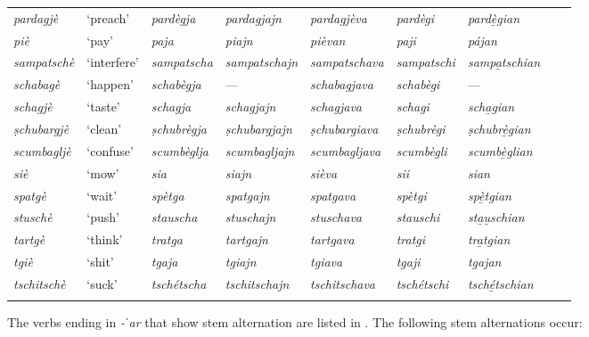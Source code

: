 \begin{sidewaystable}
\begin{tabularx}{\textwidth}{lllllllll}
		\textit{pardagjè} & ‘preach’ & \textit{pardègja} & \textit{pardagjajn} & \textit{pardagjèva} & \textit{pardègi} & \textit{pardè̱gian}\\
		\textit{piè} & ‘pay’ & \textit{paja} & \textit{piajn} & \textit{pièvan} & \textit{paji} & \textit{pájan}\\
		\textit{sampatschè} & ‘interfere’ & \textit{sampatscha} & \textit{sampatschajn} & \textit{sampatschava} & \textit{sampatschi} & \textit{sampa̱tschian}\\
		\textit{schabagè} & `happen' & \textit{schabègja} & --- & \textit{schabagjava} & \textit{schabègi} &  ---\\
		\textit{schagjè} & `taste' & \textit{schagja} & \textit{schagjajn} & \textit{schagjava} & \textit{schagi} & \textit{scha̱gian}\\
		\textit{ṣchubargjè} & `clean' & \textit{ṣchubrègja} & \textit{ṣchubargjajn} & \textit{ṣchubargiava} & \textit{ṣchubrègi} & \textit{ṣchubrè̱gian} \\
		\textit{scumbagljè} & `confuse' & \textit{scumbèglja} & \textit{scumbagljajn} & \textit{scumbagljava} & \textit{scumbègli} & \textit{scumbè̱glian}\\
		\textit{siè} & `mow' & \textit{sia} & \textit{siajn} & \textit{sièva} & \textit{sii} & \textit{sian}\\
		\textit{spatgè} & `wait' & \textit{spètga} & \textit{spatgajn} & \textit{spatgava} & \textit{spètgi} & \textit{spè̱tgian}\\
		\textit{stuschè} & `push' & \textit{stauscha} & \textit{stuschajn} & \textit{stuschava} & \textit{stauschi} & \textit{sta̱u̱schian}\\
		\textit{tartgè} & `think' & \textit{tratga} & \textit{tartgajn} & \textit{tartgava} & \textit{tratgi} & \textit{tra̱tgian}\\
		\textit{tgiè} & `shit' & \textit{tgaja} & \textit{tgiajn} & \textit{tgiava} & \textit{tgaji} & \textit{tgajan}\\
		\textit{tschitschè} & `suck' & \textit{tschétscha} & \textit{tschitschajn} & \textit{tschitschava} & \textit{tschétschi} & \textit{tsché̱tschian} \\
		
		\lspbottomrule
	\end{tabularx} 
\end{sidewaystable}

The verbs ending in \textit{-ˈar} that show stem alternation are listed in . The following stem alternations occur:
 
